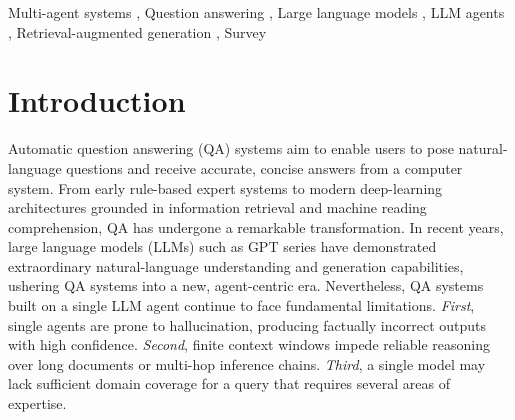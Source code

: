 \documentclass[a4paper,fleqn]{cas-dc}
\newcommand{\restorecasdoublecolumn}{%
  \normalfont
  \setlength{\columnsep}{18pt}%
  \setlength{\columnwidth}{\dimexpr(\textwidth-\columnsep)/2\relax}%
  \setlength{\hsize}{\columnwidth}%
  \setlength{\linewidth}{\columnwidth}%
}
\begin{document}
\begin{keywords}
  Multi-agent systems \sep
  Question answering \sep
  Large language models \sep
  LLM agents \sep
  Retrieval-augmented generation \sep
  Survey
\end{keywords}

\maketitle

\restorecasdoublecolumn
\setlength{\emergencystretch}{1em}

\renewcommand{\topfraction}{0.95}
\renewcommand{\bottomfraction}{0.90}
\renewcommand{\textfraction}{0.07}
\renewcommand{\floatpagefraction}{0.80}
\renewcommand{\dbltopfraction}{0.95}
\renewcommand{\dblfloatpagefraction}{0.80}
\setlength{\textfloatsep}{14pt plus 3pt minus 3pt}
\setlength{\floatsep}{12pt plus 3pt minus 2pt}
\setlength{\dbltextfloatsep}{14pt plus 3pt minus 3pt}
\setlength{\dblfloatsep}{12pt plus 3pt minus 2pt}

\section{Introduction}
\label{sec:intro}

Automatic question answering (QA) systems aim to enable users to pose
natural-language questions and receive accurate, concise answers
from a computer system.
From early rule-based expert systems to modern deep-learning architectures
grounded in information retrieval and machine reading comprehension, QA
has undergone a remarkable transformation.
In recent years, large language models (LLMs) such as GPT series
\citep{brown2020gpt3} \citep{openai2023gpt4} have demonstrated
extraordinary natural-language understanding and generation capabilities,
ushering QA systems into a new, agent-centric era.
Nevertheless, QA systems built on a single LLM agent continue to face
fundamental limitations.
\emph{First}, single agents are prone to hallucination, producing factually
incorrect outputs with high confidence.
\emph{Second}, finite context windows impede reliable reasoning over long
documents or multi-hop inference chains.
\emph{Third}, a single model may lack sufficient domain coverage for a query
that requires several areas of expertise.
\end{document}
